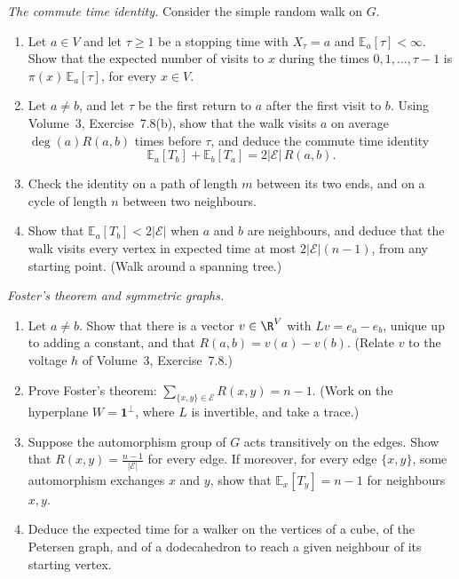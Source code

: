 \begin{exercise}[$\star\star\star$]\label{pb:commute}
\emph{The commute time identity.} Consider the simple random walk on $G$.
\begin{enumerate}[label=(\alph*)]
\item Let $a\in V$ and let $\tau\ge1$ be a stopping time with $X_\tau=a$ and $\mathbb E_a[\tau]<\infty$. Show that the expected number of visits to $x$ during
the times $0,1,\dots,\tau-1$ is $\pi(x)\,\mathbb E_a[\tau]$, for every $x\in V$.
\item Let $a\ne b$, and let $\tau$ be the first return to $a$ after the first visit to $b$. Using Volume~3, Exercise~7.8(b), show that the
walk visits $a$ on average $\deg(a)R(a,b)$ times before $\tau$, and deduce the commute time identity
\[
\mathbb E_a[T_b]+\mathbb E_b[T_a]=2|\mathcal E|\,R(a,b).
\]
\item Check the identity on a path of length $m$ between its two ends, and on a cycle of length $n$ between two neighbours.
\item Show that $\mathbb E_a[T_b]<2|\mathcal E|$ when $a$ and $b$ are neighbours, and deduce that the walk visits every vertex in expected time at most
$2|\mathcal E|(n-1)$, from any starting point. (Walk around a spanning tree.)
\end{enumerate}
\end{exercise}

\begin{exercise}[$\star\star\star$]\label{pb:foster}
\emph{Foster's theorem and symmetric graphs.}
\begin{enumerate}[label=(\alph*)]
\item Let $a\ne b$. Show that there is a vector $v\in\R^V$ with $Lv=e_a-e_b$, unique up to adding a constant, and that
$R(a,b)=v(a)-v(b)$. (Relate $v$ to the voltage $h$ of Volume~3, Exercise~7.8.)
\item Prove Foster's theorem: $\sum_{\{x,y\}\in\mathcal E}R(x,y)=n-1$. (Work on the hyperplane $W=\mathbf 1^\perp$, where $L$ is invertible, and take a trace.)
\item Suppose the automorphism group of $G$ acts transitively on the edges. Show that $R(x,y)=\frac{n-1}{|\mathcal E|}$ for every edge. If moreover, for every edge
$\{x,y\}$, some automorphism exchanges $x$ and $y$, show that $\mathbb E_x[T_y]=n-1$ for neighbours $x,y$.
\item Deduce the expected time for a walker on the vertices of a cube, of the Petersen graph, and of a dodecahedron to reach a
given neighbour of its starting vertex.
\end{enumerate}
\end{exercise}

